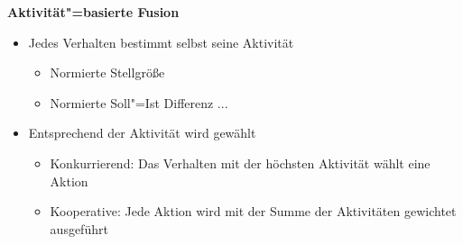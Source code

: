 \textbf{Aktivität"=basierte Fusion}
\begin{itemize}
	\item Jedes Verhalten bestimmt selbst seine Aktivität
	\begin{itemize}
		\item Normierte Stellgröße
		\item Normierte Soll"=Ist Differenz ...
	\end{itemize}
	\item Entsprechend der Aktivität wird gewählt
	\begin{itemize}
		\item Konkurrierend: Das Verhalten mit der höchsten Aktivität wählt eine Aktion
		\item Kooperative: Jede Aktion wird mit der Summe der Aktivitäten gewichtet ausgeführt
	\end{itemize}
\end{itemize}

